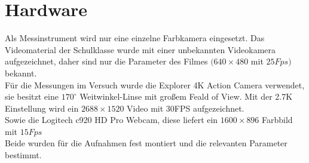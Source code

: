 \section{Hardware}
\label{hardware}
Als Messinstrument wird nur eine einzelne Farbkamera eingesetzt. Das Videomaterial der Schulklasse wurde mit einer unbekannten Videokamera aufgezeichnet, daher sind nur die Parameter des Filmes $(640 \times 480$ mit $25Fps)$ bekannt.\\
Für die Messungen im Versuch wurde die Explorer 4K Action Camera verwendet, sie besitzt eine $170^\circ$ Weitwinkel-Linse mit großem Feald of View. Mit der 2.7K Einstellung wird ein $2688 \times 1520$ Video mit 30FPS aufgezeichnet.\\
Sowie die Logitech c920 HD Pro Webcam, diese liefert ein $1600\times 896$ Farbbild mit $15Fps$\\
Beide wurden für die Aufnahmen fest montiert und die relevanten Parameter bestimmt.